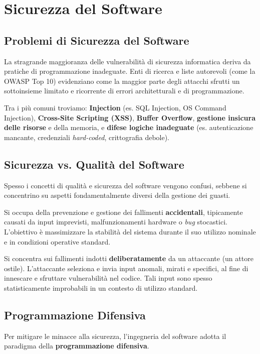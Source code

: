\chapter{Sicurezza del Software}

\section{Problemi di Sicurezza del Software}
La stragrande maggioranza delle vulnerabilità di sicurezza informatica deriva da pratiche di programmazione inadeguate. Enti di ricerca e liste autorevoli (come la OWASP Top 10) evidenziano come la maggior parte degli attacchi sfrutti un sottoinsieme limitato e ricorrente di errori architetturali e di programmazione. 

Tra i più comuni troviamo: \textbf{Injection} (es. SQL Injection, OS Command Injection), \textbf{Cross-Site Scripting (XSS)}, \textbf{Buffer Overflow}, \textbf{gestione insicura delle risorse} e della memoria, e \textbf{difese logiche inadeguate} (es. autenticazione mancante, credenziali \textit{hard-coded}, crittografia debole).

\section{Sicurezza vs. Qualità del Software}
Spesso i concetti di qualità e sicurezza del software vengono confusi, sebbene si concentrino su aspetti fondamentalmente diversi della gestione dei guasti.

\begin{defbox}
Si occupa della prevenzione e gestione dei fallimenti \textbf{accidentali}, tipicamente causati da input imprevisti, malfunzionamenti hardware o \textit{bug} stocastici. L'obiettivo è massimizzare la stabilità del sistema durante il suo utilizzo nominale e in condizioni operative standard.
\end{defbox}

\begin{defbox}
Si concentra sui fallimenti indotti \textbf{deliberatamente} da un attaccante (un attore ostile). L'attaccante seleziona e invia input anomali, mirati e specifici, al fine di innescare e sfruttare vulnerabilità nel codice. Tali input sono spesso statisticamente improbabili in un contesto di utilizzo standard.
\end{defbox}

\section{Programmazione Difensiva}
Per mitigare le minacce alla sicurezza, l'ingegneria del software adotta il paradigma della \textbf{programmazione difensiva}. 

